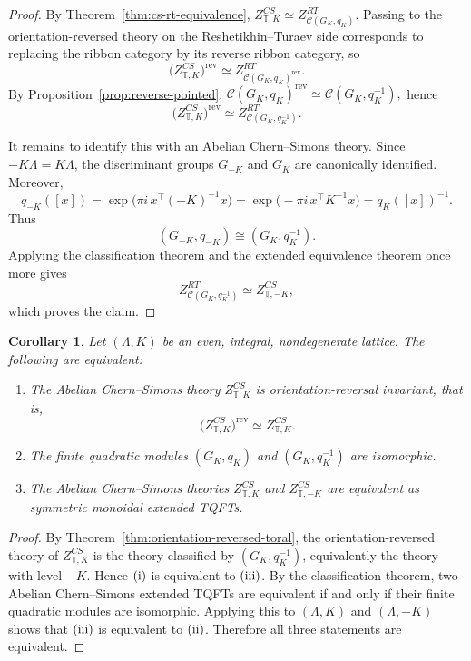 \documentclass[12pt]{amsart}
\numberwithin{equation}{section}
\newtheorem{corollary}[theorem]{Corollary}
\theoremstyle{definition}
\begin{document}
\begin{proof}
By Theorem~\ref{thm:cs-rt-equivalence}, $Z^{CS}_{\mathbb T,K}\simeq Z^{RT}_{\mathcal C(G_K,q_K)}.$ Passing to the orientation-reversed theory on the Reshetikhin--Turaev side corresponds to replacing the
ribbon category by its reverse ribbon category, so
$$
\bigl(Z^{CS}_{\mathbb T,K}\bigr)^{\mathrm{rev}}
\simeq
Z^{RT}_{\mathcal C(G_K,q_K)^{\mathrm{rev}}}.
$$
By Proposition~\ref{prop:reverse-pointed}, $\mathcal C(G_K,q_K)^{\mathrm{rev}}
\simeq
\mathcal C(G_K,q_K^{-1}),$ hence
$$
\bigl(Z^{CS}_{\mathbb T,K}\bigr)^{\mathrm{rev}}
\simeq
Z^{RT}_{\mathcal C(G_K,q_K^{-1})}.
$$

It remains to identify this with an Abelian Chern--Simons theory.
Since $-K\Lambda=K\Lambda$, the discriminant groups $G_{-K}$ and $G_K$ are
canonically identified.
Moreover,
$$
q_{-K}([x])
=
\exp\!\bigl(\pi i\,x^{\top}(-K)^{-1}x\bigr)
=
\exp\!\bigl(-\pi i\,x^{\top}K^{-1}x\bigr)
=
q_K([x])^{-1}.
$$
Thus
$$
(G_{-K},q_{-K})\cong (G_K,q_K^{-1}).
$$
Applying the classification theorem and the extended equivalence theorem once more gives
$$
Z^{RT}_{\mathcal C(G_K,q_K^{-1})}
\simeq
Z^{CS}_{\mathbb T,-K},
$$
which proves the claim.
\end{proof}

\begin{corollary}
\label{cor:orientation-reversal-invariant}
Let $(\Lambda,K)$ be an even, integral, nondegenerate lattice.
The following are equivalent:
\begin{enumerate}[label=\rm(\roman*)]
\item The Abelian Chern--Simons theory $Z^{CS}_{\mathbb T,K}$ is orientation-reversal
      invariant, that is,
      $$
      \bigl(Z^{CS}_{\mathbb T,K}\bigr)^{\mathrm{rev}}
      \simeq
      Z^{CS}_{\mathbb T,K}.
      $$
\item The finite quadratic modules $(G_K,q_K)$ and $(G_K,q_K^{-1})$ are isomorphic.
\item The Abelian Chern--Simons theories $Z^{CS}_{\mathbb T,K}$ and
      $Z^{CS}_{\mathbb T,-K}$ are equivalent as symmetric monoidal extended TQFTs.
\end{enumerate}
\end{corollary}

\begin{proof}
By Theorem~\ref{thm:orientation-reversed-toral}, the orientation-reversed theory of $Z^{CS}_{\mathbb T,K}$ is the theory classified by $(G_K,q_K^{-1})$, equivalently the theory with level $-K$. Hence $\rm(i)$ is equivalent to $\rm(iii)$. By the classification theorem, two Abelian Chern--Simons extended TQFTs are equivalent if and only if their finite quadratic modules are isomorphic. Applying this to $(\Lambda,K)$ and $(\Lambda,-K)$ shows that $\rm(iii)$ is equivalent to $\rm(ii)$. Therefore all three statements are equivalent.
\end{proof}
\end{document}

